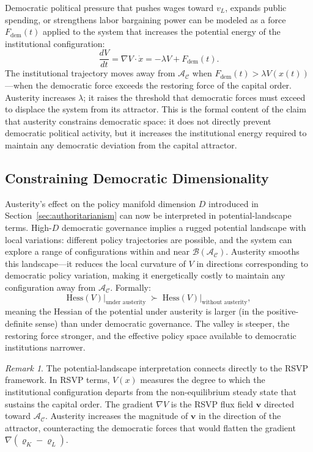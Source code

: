 \documentclass[12pt,a4paper]{article}
\theoremstyle{definition}
\theoremstyle{remark}
\newtheorem{remark}{Remark}[section]
\begin{document}
Democratic political pressure that pushes wages toward $v_L$, expands public spending, or strengthens labor bargaining power can be modeled as a force $F_{\text{dem}}(t)$ applied to the system that increases the potential energy of the institutional configuration:
\begin{equation}
  \frac{dV}{dt} = \nabla V \cdot \dot x = -\lambda V + F_{\text{dem}}(t).
\end{equation}
The institutional trajectory moves away from $\mathcal{A}_\mathcal{C}$ when $F_{\text{dem}}(t) > \lambda V(x(t))$---when the democratic force exceeds the restoring force of the capital order. Austerity increases $\lambda$; it raises the threshold that democratic forces must exceed to displace the system from its attractor. This is the formal content of the claim that austerity constrains democratic space: it does not directly prevent democratic political activity, but it increases the institutional energy required to maintain any democratic deviation from the capital attractor.

\subsection{Constraining Democratic Dimensionality}

Austerity's effect on the policy manifold dimension $D$ introduced in Section~\ref{sec:authoritarianism} can now be interpreted in potential-landscape terms. High-$D$ democratic governance implies a rugged potential landscape with local variations: different policy trajectories are possible, and the system can explore a range of configurations within and near $\mathcal{B}(\mathcal{A}_\mathcal{C})$. Austerity smooths this landscape---it reduces the local curvature of $V$ in directions corresponding to democratic policy variation, making it energetically costly to maintain any configuration away from $\mathcal{A}_\mathcal{C}$. Formally:
\begin{equation}
  \text{Hess}(V)\big|_{\text{under austerity}} \;\succ\; \text{Hess}(V)\big|_{\text{without austerity}},
\end{equation}
meaning the Hessian of the potential under austerity is larger (in the positive-definite sense) than under democratic governance. The valley is steeper, the restoring force stronger, and the effective policy space available to democratic institutions narrower.

\begin{remark}
The potential-landscape interpretation connects directly to the RSVP framework. In RSVP terms, $V(x)$ measures the degree to which the institutional configuration departs from the non-equilibrium steady state that sustains the capital order. The gradient $\nabla V$ is the RSVP flux field $\mathbf{v}$ directed toward $\mathcal{A}_\mathcal{C}$. Austerity increases the magnitude of $\mathbf{v}$ in the direction of the attractor, counteracting the democratic forces that would flatten the gradient $\nabla(\varrho_K - \varrho_L)$.
\end{remark}
\end{document}
